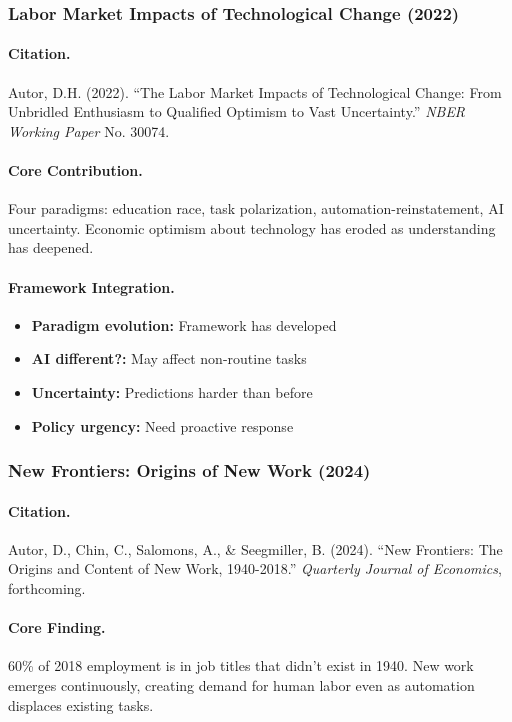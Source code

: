 \documentclass[12pt,a4paper]{article}
\begin{document}
\subsubsection{Labor Market Impacts of Technological Change (2022)}

\paragraph{Citation.}
Autor, D.H. (2022). ``The Labor Market Impacts of Technological Change:
From Unbridled Enthusiasm to Qualified Optimism to Vast Uncertainty.''
\emph{NBER Working Paper} No. 30074.

\paragraph{Core Contribution.}
Four paradigms: education race, task polarization, automation-reinstatement,
AI uncertainty. Economic optimism about technology has eroded as
understanding has deepened.

\paragraph{Framework Integration.}
\begin{itemize}
  \item \textbf{Paradigm evolution:} Framework has developed
  \item \textbf{AI different?:} May affect non-routine tasks
  \item \textbf{Uncertainty:} Predictions harder than before
  \item \textbf{Policy urgency:} Need proactive response
\end{itemize}

\subsubsection{New Frontiers: Origins of New Work (2024)}

\paragraph{Citation.}
Autor, D., Chin, C., Salomons, A., \& Seegmiller, B. (2024).
``New Frontiers: The Origins and Content of New Work, 1940-2018.''
\emph{Quarterly Journal of Economics}, forthcoming.

\paragraph{Core Finding.}
60\% of 2018 employment is in job titles that didn't exist in 1940.
New work emerges continuously, creating demand for human labor
even as automation displaces existing tasks.
\end{document}

